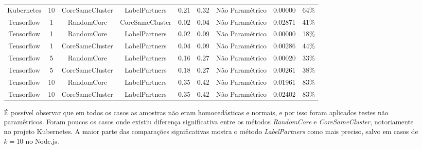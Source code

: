 \documentclass[12pt,openany,oneside,a4paper,english,brazil]{abntbibufjf}
\begin{document}
\begin{table}[htbp]
\begin{center}
{\begin{tabular}{|c|c|c|c|c|c|c|c|c|}
   Kubernetes       & 10         & CoreSameCluster   & LabelPartners     & 0.21             & 0.32             & Não Paramétrico        & 0.00000          & 64\%               \\
   Tensorflow       & 1          & RandomCore        & CoreSameCluster   & 0.02             & 0.04             & Não Paramétrico        & 0.02871          & 41\%               \\
   Tensorflow       & 1          & RandomCore        & LabelPartners     & 0.02             & 0.09             & Não Paramétrico        & 0.00000          & 18\%               \\
   Tensorflow       & 1          & CoreSameCluster   & LabelPartners     & 0.04             & 0.09             & Não Paramétrico        & 0.00286          & 44\%               \\
   Tensorflow       & 5          & RandomCore        & LabelPartners     & 0.16             & 0.27             & Não Paramétrico        & 0.00020          & 33\%               \\
   Tensorflow       & 5          & CoreSameCluster   & LabelPartners     & 0.18             & 0.27             & Não Paramétrico        & 0.00261          & 38\%               \\
   Tensorflow       & 10         & RandomCore        & LabelPartners     & 0.35             & 0.42             & Não Paramétrico        & 0.01961          & 83\%               \\
   Tensorflow       & 10         & CoreSameCluster   & LabelPartners     & 0.35             & 0.42             & Não Paramétrico        & 0.02402          & 83\%               \\
   \end{tabular}%
   }
   \hline

 \label{tab:resultados-precisao}
 \end{center}
 \end{table}


 É possível observar que em todos os casos as amostras não eram homocedásticas e normais, e por isso foram aplicados testes não paramêtricos. Foram poucos os casos onde existiu diferença significativa entre os métodos \textit{RandomCore} e \textit{CoreSameCluster}, notoriamente no projeto Kubernetes. A maior parte das comparações significativas mostra o método \textit{LabelPartners} como mais preciso, salvo em casos de $k = 10$ no Node.js.
\end{document}
